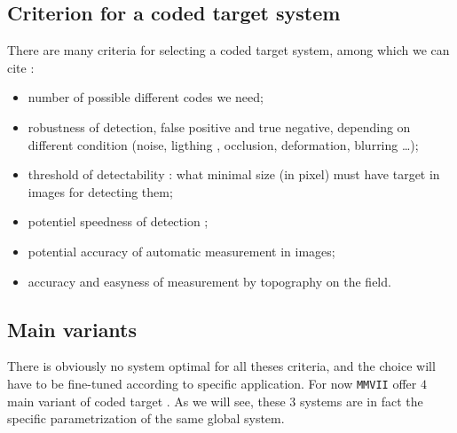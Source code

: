 
\subsection{Criterion for a coded target system}

There are many criteria for selecting a coded target system, among which we can cite :

\begin{itemize}
    \item number of possible different codes we need;

    \item robustness of detection, false positive and true negative,  depending on
	    different condition  (noise, ligthing , occlusion,  deformation, blurring \dots);

    \item threshold of detectability : what minimal size (in pixel) must have target in images
	    for detecting them;

    \item potentiel speedness of detection ;

    \item potential accuracy of automatic measurement in images;

    \item accuracy and easyness of measurement by topography on the field.

\end{itemize}



\subsection{Main variants}

There is obviously no system optimal for all theses criteria, and the choice will have to
be fine-tuned according to specific application.
For now {\tt MMVII} offer $4$ main variant of coded target . As we will see, these $3$ systems are in
fact the specific parametrization of the same global system.

